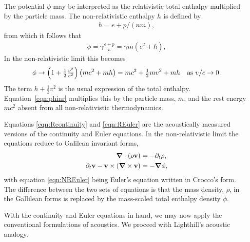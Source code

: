\documentclass[10pt, fleqn,final,showtrims,oldfontcommands, article,a4paper,oneside]{memoir} %
\newcommand{\sub}[1]{\begin{subequations}#1\end{subequations}}
\newcommand{\eqnref}[1]{\ref{eqn:#1}}
\newcommand{\lr}[1]{\left( #1 \right)}
\renewcommand{\d}{\partial}
\newcommand{\del}{\nabla}
\newcommand{\vdel}{ \mbox{\boldmath $\del$}}
\newcommand{\dt}{{\d_t}}
\newcommand{\half}{\tfrac{1}{2}}
\newcommand{\vA}{\textbf{A}}
\newcommand{\vv}{\textbf{v}}
\begin{document}
The potential $\phi$ may be  interpreted as the relativistic  total enthalpy multiplied by the particle mass.
The non-relativistic enthalpy $h$ is defined by
\begin{align}
  h = e + p/(nm),
\end{align}
from which it follows that 
\begin{align}
  \phi =   \gamma\frac{\epsilon + p }{n} = \gamma m\lr{c^2 + h},
\end{align}
In the  non-relativistic limit this becomes
\begin{align}
  \phi \rightarrow \lr{1+\tfrac{1}{2}\tfrac{v^2}{c^2}} \lr{mc^2 + mh} = mc^2 + \tfrac{1}{2}m v^2 + mh \text{\quad as ${v/c\rightarrow 0.}$}
  \label{eqn:phinr}
\end{align}
The term $h + \half v^2$ is the usual expression of the total enthalpy.
Equation~\ref{eqn:phinr} multiplies this by the particle mass, $m$, and the rest energy $mc^2$ absent from all non-relativistic thermodynamics.




Equations \eqnref{Rcontinuity} and \eqnref{REuler} are the acoustically measured versions of the continuity and Euler equations.
In the non-relativistic limit the equations reduce to Galilean invariant forms, 
\sub{
\begin{align}
  \vdel\cdot\lr{\rho \vv}  &= -\dt \rho, \label{eqn:NRcontinuity}\\
  \dt \vv - \vv\times \lr{\vdel\times \vv} &= - \vdel \phi,\label{eqn:NREuler}
\end{align}
}
with 
equation \eqnref{NREuler} being Euler's equation written in Crocco's form\cite{Howe1998}.
The difference between the two sets of equations is that the mass density, $\rho$, in the Gallilean forms is
replaced by the mass-scaled total enthalpy density $\phi$. 

With the continuity and Euler equations in hand,
we may now apply the conventional formulations of acoustics.
We proceed with Lighthill's acoustic analogy\cite{Lighthill1952, Howe1998}.
\end{document}
